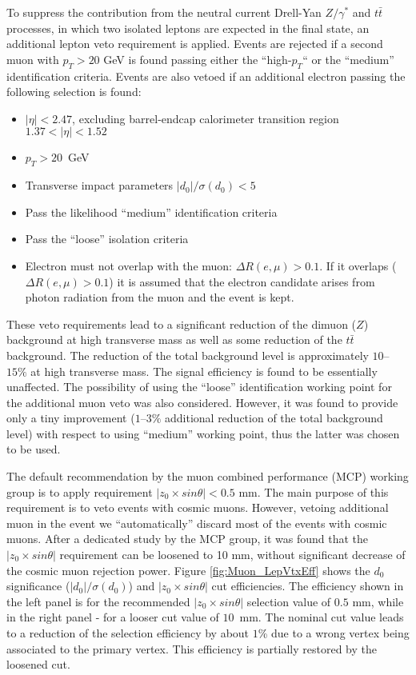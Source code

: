 To suppress the contribution from the neutral current Drell-Yan $Z/\gamma^*$ and $t\bar{t}$ processes,
in which two isolated leptons are expected in the final state, an additional lepton veto requirement
is applied. 
Events are rejected if a second muon with $p_T > 20$ GeV is found passing
either the ``high-$p_T$`` or the ``medium'' identification criteria.
Events are also vetoed if an additional electron passing the following selection is found:
\begin{itemize}
\item $|\eta| < 2.47$, excluding barrel-endcap calorimeter transition region $1.37 < |\eta| < 1.52$
\item $p_T > 20$~GeV
\item Transverse impact parameters $|d_0|/\sigma(d_0) < 5$
\item Pass the likelihood ``medium'' identification criteria~\cite{ATL-PHYS-PUB-2015-041}
\item Pass the ``loose'' isolation criteria~\cite{ATLAS-CONF-2016-024}
\item Electron must not overlap with the muon: $\Delta R(e,\mu)>0.1$. If it overlaps ($\Delta R(e,\mu)>0.1$)
it is assumed that the electron candidate arises from photon radiation from the muon and the event is kept.
\end{itemize}
These veto requirements lead to a significant reduction of the dimuon ($Z$) background
at high transverse mass as well as some reduction of the $t\bar{t}$ background.
The reduction of the total background level is approximately $10$--$15\%$ at high transverse mass. 
The signal efficiency is found to be essentially unaffected.
The possibility of using the ``loose'' identification working point for the additional muon veto was also considered. However, it was found to provide only a tiny improvement ($1$--$3\%$ additional reduction of the total background level) with respect to using ``medium'' working point, thus the latter was chosen to be used.

The default recommendation by the muon combined performance (MCP) working group is to apply requirement $|z_0 \times sin \theta| < 0.5$ mm. The main purpose of this requirement is to veto events with cosmic muons.
However, vetoing additional muon in the event we ``automatically'' discard most of the events with cosmic muons. After a dedicated study by the MCP group, it was found that the 
$|z_0 \times sin \theta|$ requirement can be loosened to 10 mm, without significant decrease of the cosmic muon rejection power.
Figure \ref{fig:Muon_LepVtxEff} shows the $d_0$ significance ($|d_0|/\sigma(d_0)$) and $|z_0 \times sin \theta|$ cut efficiencies. The efficiency shown in the left panel is for the recommended $|z_0 \times sin \theta|$ selection value of $0.5$ mm, while in the right panel - for a looser
cut value of $10$~mm. The nominal cut value leads to a reduction of the selection efficiency by about $1$\% due to a wrong vertex being associated to the primary vertex. This efficiency is partially restored by the loosened cut.

